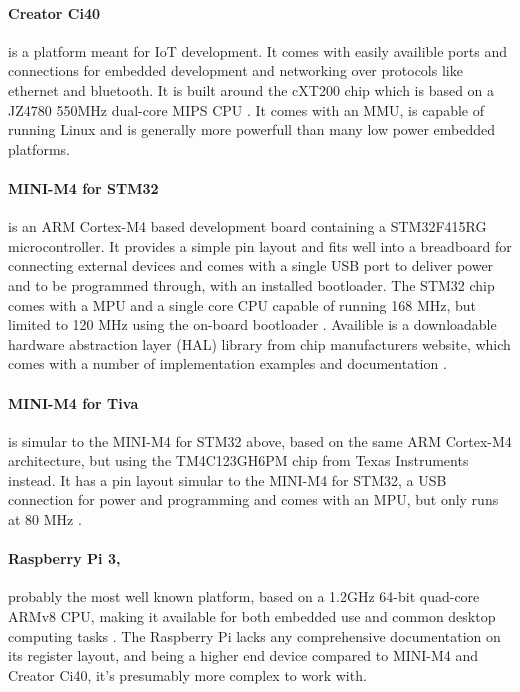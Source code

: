 \paragraph{Creator Ci40} is a platform meant for IoT development.
It comes with easily availible ports and connections for embedded development
and networking over protocols like ethernet and bluetooth.
It is built around the cXT200 chip which is based on a JZ4780 550MHz dual-core MIPS CPU \cite{creator_ci40_specs}.
It comes with an MMU, is capable of running Linux
and is generally more powerfull than many low power embedded platforms.

\paragraph{MINI-M4 for STM32} is an ARM Cortex-M4 based development board containing a STM32F415RG microcontroller.
It provides a simple pin layout and fits well into a breadboard for connecting external devices
and comes with a single USB port to deliver power and to be programmed through, with an installed bootloader.
The STM32 chip comes with a MPU and a single core CPU capable of running 168 MHz,
but limited to 120 MHz using the on-board bootloader \cite{MINI-M4_stm32_specs}.
Availible is a downloadable hardware abstraction layer (HAL) library from chip manufacturers website,
which comes with a number of implementation examples and documentation \cite{HAL_library}.

\paragraph{MINI-M4 for Tiva} is simular to the MINI-M4 for STM32 above,
based on the same ARM Cortex-M4 architecture,
but using the TM4C123GH6PM chip from Texas Instruments instead.
It has a pin layout simular to the MINI-M4 for STM32,
a USB connection for power and programming and comes with an MPU,
but only runs at 80 MHz \cite{MINI-M4_tiva_specs}.

\paragraph{Raspberry Pi 3,} probably the most well known platform,
based on a 1.2GHz 64-bit quad-core ARMv8 CPU,
making it available for both embedded use and common desktop computing tasks \cite{raspberry_specs}.
The Raspberry Pi lacks any comprehensive documentation on its register layout,
and being a higher end device compared to MINI-M4 and Creator Ci40,
it's presumably more complex to work with.

